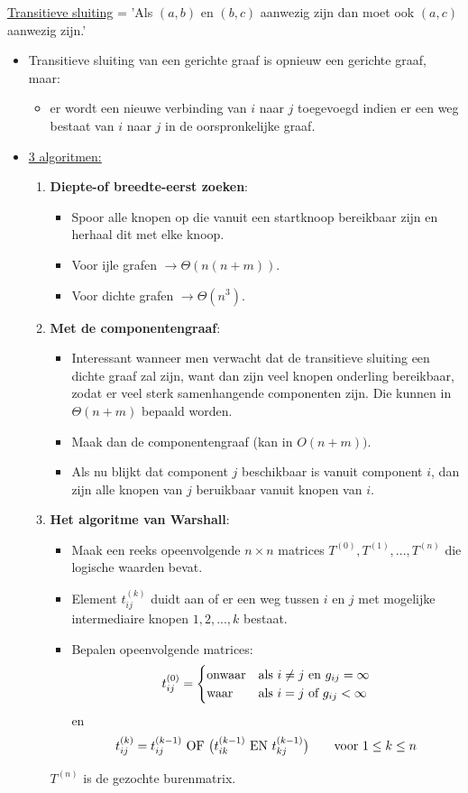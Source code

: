 \underline{Transitieve sluiting} = 'Als $(a, b)$ en $(b, c)$ aanwezig zijn dan moet ook $(a, c)$ aanwezig zijn.'

\begin{itemize}
	\item Transitieve sluiting van een gerichte graaf is opnieuw een gerichte graaf, maar:
	\begin{itemize}
		\item er wordt een nieuwe verbinding van $i$ naar $j$ toegevoegd indien er een weg bestaat van $i$ naar $j$ in de oorspronkelijke graaf.
	\end{itemize}
	\item \underline{3 algoritmen:}
	\begin{enumerate}
		\item \textbf{Diepte-of breedte-eerst zoeken}: 
				\begin{itemize}
					\item Spoor alle knopen op die vanuit een startknoop bereikbaar zijn en herhaal dit met elke knoop.
					\item Voor ijle grafen $\rightarrow \Theta(n(n + m))$.
					\item Voor dichte grafen $\rightarrow \Theta(n^3)$.
				\end{itemize}
		\item \textbf{Met de componentengraaf}:
				\begin{itemize}
					\item Interessant wanneer men verwacht dat de transitieve sluiting een dichte graaf zal zijn, want dan zijn veel knopen onderling bereikbaar, zodat er veel sterk samenhangende componenten zijn. Die kunnen in $\Theta(n + m)$ bepaald worden.
					\item Maak dan de componentengraaf (kan in $O(n + m))$.
					\item Als nu blijkt dat component $j$ beschikbaar is vanuit component $i$, dan zijn alle knopen van $j$ beruikbaar vanuit knopen van $i$.
				\end{itemize}
		\item \textbf{Het algoritme van Warshall}:
				\begin{itemize}
					\item Maak een reeks opeenvolgende $n \times n$ matrices $T^{(0)},T^{(1)},...,T^{(n)}$ die logische waarden bevat.
					\item Element $t_{ij}^{(k)}$ duidt aan of er een weg tussen $i$ en $j$ met mogelijke intermediaire knopen $1, 2, ..., k$ bestaat.
					\item Bepalen opeenvolgende matrices:
					$$t_{ij}^{(0)} = 
					\begin{cases}
						\hbox{onwaar} & \hbox{als } i \neq j \hbox{ en } g_{ij} = \infty\\
						\hbox{waar}   & \hbox{als } i = j \hbox{ of } g_{ij} < \infty
					\end{cases}$$
					en
					$$
						t_{ij}^{(k)} = t_{ij}^{(k - 1)} \hbox{ OF } \big(t_{ik}^{(k - 1)} \hbox{ EN } t_{kj}^{(k - 1)}\big) \qquad \hbox{voor } 1 \leq k \leq n
					$$
				\end{itemize}
				$T^{(n)}$ is de gezochte burenmatrix.
	\end{enumerate}
\end{itemize}